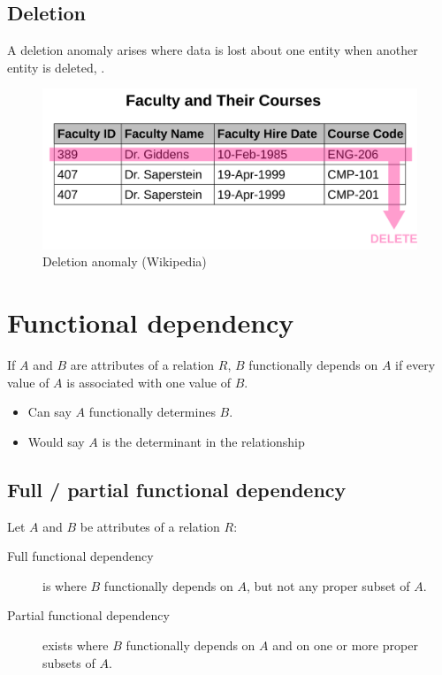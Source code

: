 \subsection{Deletion}\label{deletion}

A deletion anomaly arises where data is lost about one entity when
another entity is deleted, .

\begin{figure}[htbp]
\centering
\includegraphics[width=0.5\linewidth]{deletion_anomaly}
\caption{Deletion anomaly (Wikipedia){}}
\end{figure}

\newpage

\section{Functional dependency}\label{functional-dependency}

If \(A\) and \(B\) are attributes of a relation \(R\), \(B\)
functionally depends on \(A\) if every value of \(A\) is associated with
one value of \(B\).

\begin{itemize}
\item
  Can say \(A\) functionally determines \(B\).
\item
  Would say \(A\) is the determinant in the relationship
\end{itemize}

\subsection{Full / partial functional
dependency}\label{full-partial-functional-dependency}

Let \(A\) and \(B\) be attributes of a relation \(R\):

\begin{description}
\item[Full functional dependency]
is where \(B\) functionally depends on \(A\), but not any proper subset
of \(A\).
\item[Partial functional dependency]
exists where \(B\) functionally depends on \(A\) and on one or more
proper subsets of \(A\).
\end{description}


